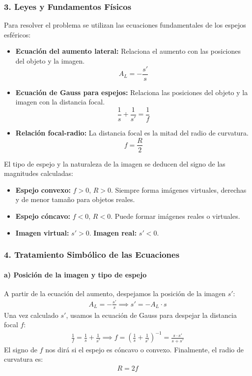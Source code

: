 \subsubsection*{3. Leyes y Fundamentos Físicos}
Para resolver el problema se utilizan las ecuaciones fundamentales de los espejos esféricos:
\begin{itemize}
    \item \textbf{Ecuación del aumento lateral:} Relaciona el aumento con las posiciones del objeto y la imagen.
    $$A_L = -\frac{s'}{s}$$
    \item \textbf{Ecuación de Gauss para espejos:} Relaciona las posiciones del objeto y la imagen con la distancia focal.
    $$\frac{1}{s} + \frac{1}{s'} = \frac{1}{f}$$
    \item \textbf{Relación focal-radio:} La distancia focal es la mitad del radio de curvatura.
    $$f = \frac{R}{2}$$
\end{itemize}
El tipo de espejo y la naturaleza de la imagen se deducen del signo de las magnitudes calculadas:
\begin{itemize}
    \item \textbf{Espejo convexo:} $f > 0$, $R > 0$. Siempre forma imágenes virtuales, derechas y de menor tamaño para objetos reales.
    \item \textbf{Espejo cóncavo:} $f < 0$, $R < 0$. Puede formar imágenes reales o virtuales.
    \item \textbf{Imagen virtual:} $s' > 0$. \textbf{Imagen real:} $s' < 0$.
\end{itemize}

\subsubsection*{4. Tratamiento Simbólico de las Ecuaciones}
\paragraph{a) Posición de la imagen y tipo de espejo}
A partir de la ecuación del aumento, despejamos la posición de la imagen $s'$:
\begin{gather}
    A_L = -\frac{s'}{s} \implies s' = -A_L \cdot s
\end{gather}
Una vez calculado $s'$, usamos la ecuación de Gauss para despejar la distancia focal $f$:
\begin{gather}
    \frac{1}{f} = \frac{1}{s} + \frac{1}{s'} \implies f = \left( \frac{1}{s} + \frac{1}{s'} \right)^{-1} = \frac{s \cdot s'}{s + s'}
\end{gather}
El signo de $f$ nos dirá si el espejo es cóncavo o convexo. Finalmente, el radio de curvatura es:
\begin{gather}
    R = 2f
\end{gather}

